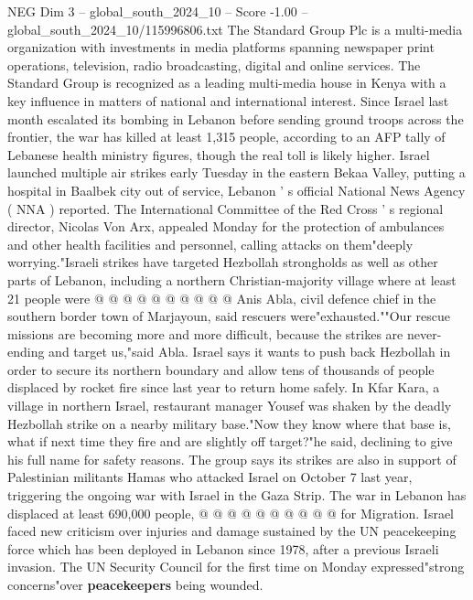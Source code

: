 \begin{textsample}{NEG Dim 3 – global\_south\_2024\_10 – Score -1.00 – global\_south\_2024\_10/115996806.txt}  \label{ex:f3_neg_057}
The Standard Group Plc is a multi-media organization with investments in media platforms spanning newspaper print operations, television, radio broadcasting, digital and online services.
The Standard Group is recognized as a leading multi-media house in Kenya with a key influence in matters of national and international interest.
Since Israel last month escalated its bombing in Lebanon before sending ground troops across the frontier, the war has killed at least 1,315 people, according to an AFP tally of Lebanese health ministry figures, though the real toll is likely higher.
Israel launched multiple air strikes early Tuesday in the eastern Bekaa Valley, putting a hospital in Baalbek city out of service, Lebanon ' s official National News Agency ( NNA ) reported.
The International Committee of the Red Cross ' s regional director, Nicolas Von Arx, appealed Monday for the protection of ambulances and other health facilities and personnel, calling attacks on them"deeply worrying."Israeli strikes have targeted Hezbollah strongholds as well as other parts of Lebanon, including a northern Christian-majority village where at least 21 people were @ @ @ @ @ @ @ @ @ @ Anis Abla, civil defence chief in the southern border town of Marjayoun, said rescuers were"exhausted.""Our rescue missions are becoming more and more difficult, because the strikes are never-ending and target us,"said Abla.
Israel says it wants to push back Hezbollah in order to secure its northern boundary and allow tens of thousands of people displaced by rocket fire since last year to return home safely.
In Kfar Kara, a village in northern Israel, restaurant manager Yousef was shaken by the deadly Hezbollah strike on a nearby military base."Now they know where that base is, what if next time they fire and are slightly off target?"he said, declining to give his full name for safety reasons.
The group says its strikes are also in support of Palestinian militants Hamas who attacked Israel on October 7 last year, triggering the ongoing war with Israel in the Gaza Strip.
The war in Lebanon has displaced at least 690,000 people, @ @ @ @ @ @ @ @ @ @ for Migration.
Israel faced new criticism over injuries and damage sustained by the UN peacekeeping force which has been deployed in Lebanon since 1978, after a previous Israeli invasion.
The UN Security Council for the first time on Monday expressed"strong concerns"over \textbf{peacekeepers} being wounded.

\end{textsample}
